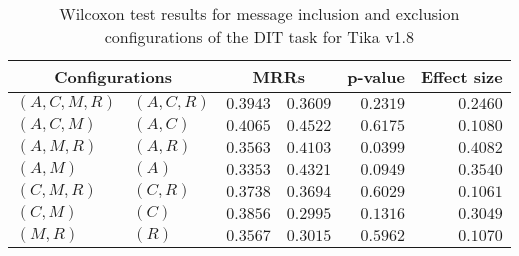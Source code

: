 
\begin{table}
\begin{spacing}{1.2}
\centering
\caption{Wilcoxon test results for message inclusion and exclusion configurations of the DIT task for Tika v1.8}
\label{table:versus-wilcox-tika-dit-message}
\begin{tabular}{ll|rr|rr}
\toprule
      \multicolumn{2}{c|}{Configurations} &          \multicolumn{2}{c|}{MRRs} &       p-value & Effect size \\
\midrule
 $(A,C,M,R)$ &  $(A,C,R)$ & $0.3943$ & $0.3609$ & $0.2319$ &    $0.2460$ \\
   $(A,C,M)$ &    $(A,C)$ & $0.4065$ & $0.4522$ & $0.6175$ &    $0.1080$ \\
   $(A,M,R)$ &    $(A,R)$ & $0.3563$ & $0.4103$ & $0.0399$ &    $0.4082$ \\
     $(A,M)$ &      $(A)$ & $0.3353$ & $0.4321$ & $0.0949$ &    $0.3540$ \\
   $(C,M,R)$ &    $(C,R)$ & $0.3738$ & $0.3694$ & $0.6029$ &    $0.1061$ \\
     $(C,M)$ &      $(C)$ & $0.3856$ & $0.2995$ & $0.1316$ &    $0.3049$ \\
     $(M,R)$ &      $(R)$ & $0.3567$ & $0.3015$ & $0.5962$ &    $0.1070$ \\
\bottomrule
\end{tabular}

\end{spacing}
\end{table}

